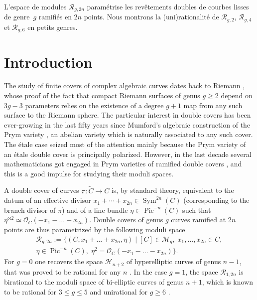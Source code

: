 \documentclass[JEP,XML,SOM,Unicode,NoEqCountersInSection,published]{cedram}
\theoremstyle{plain}
\theoremstyle{definition}
\DeclareMathOperator{\Pic}{Pic}
\DeclareMathOperator{\Sym}{Sym}
\newcommand\M{{\mathcal M}}
\newcommand\R{{\mathcal R}}
\begin{document}
\begin{altabstract}
L'espace de modules $\mathcal{R}_{g,2n}$ paramétrise les revêtements doubles de courbes lisses de genre~$g$ ramifiés en $2n$ points. Nous montrons la (uni)rationalité de $\mathcal{R}_{g,2}$, $\mathcal R_{g,4}$ et $\mathcal R_{g,6}$ en petits genres.
\end{altabstract}

\maketitle
\vspace*{-\baselineskip}
\tableofcontents
\mainmatter
\vspace*{-3\baselineskip}\mbox{}

\section{Introduction}
The study of finite covers of complex algebraic curves dates back to Riemann \cite{Ri}, whose proof of the fact that compact Riemann surfaces of genus $g\geq 2$ depend on $3g-3$ parameters relies on the existence of a degree $g+1$ map from any such surface to the Riemann sphere. The particular interest in double covers has been ever-growing in the last fifty years since Mumford's algebraic construction of the Prym variety \cite{Mu}, an abelian variety which is naturally associated  to any such cover. The étale case seized most of the attention mainly because the Prym variety of an étale double cover is principally polarized. However, in the last decade several mathematicians got engaged in Prym varieties of ramified double covers \cite{MP,NOV,NO}, and this is a good impulse for studying their moduli spaces.

A double cover of curves $\pi:\widetilde C\to C$ is, by standard theory, equivalent to the datum of an effective divisor $x_1+\cdots+x_{2n}\in \Sym^{2n}(C)$ (corresponding to the branch divisor of $\pi$) and of a line bundle $\eta\in \Pic^{-n}(C)$ such that $\eta^{\otimes 2}\simeq \mathcal O_C(-x_1-\ldots-x_{2n})$. Double covers of genus $g$ curves ramified at $2n$ points are thus parametrized by the following moduli space
\begin{multline*}
\mathcal{R}_{g,2n}:= \Big\{(C,x_1+\ldots+x_{2n},\eta)\mid [C]\in\M_g,\; x_1,\ldots,x_{2n} \in C,\\
\eta\in\Pic^{-n}(C),\; \eta^2=\mathcal O_C(-x_1-\ldots-x_{2n}) \Big\}.
\end{multline*}
For $g=0$ one recovers the space $\mathcal H_{n+2}$ of hyperelliptic curves of genus $n-1$, that was proved to be rational for any $n$ \cite{Bo,K1,K2}. In the case $g=1$, the space $\R_{1,2n}$ is birational to the moduli space of bi-elliptic curves of genus $n+1$, which is known to be rational for $3\leq g\leq 5$ \cite{BdC1,BdC2,CdC1} and unirational for $g\geq 6$ \cite{CdC2}.
\end{document}
